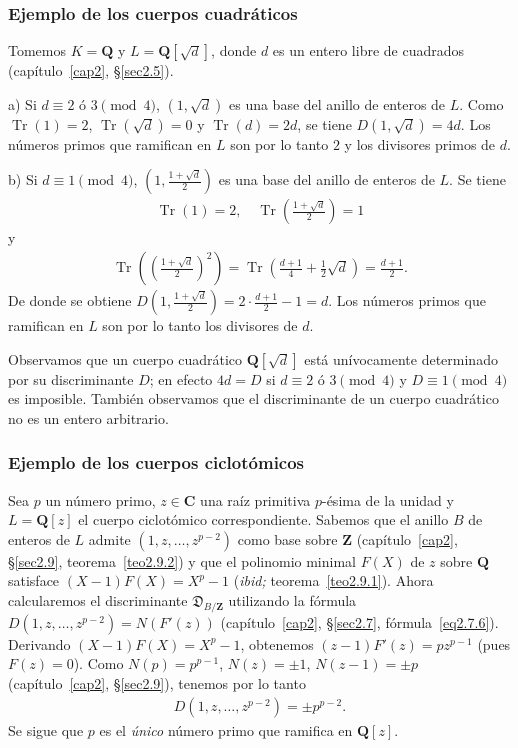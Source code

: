 \documentclass[oneside,bibtotoc,leqno,spanish]{amsbook}
\newcommand{\QQ}{\mathbf{Q}}
\newcommand{\ZZ}{\mathbf{Z}}
\newcommand{\CC}{\mathbf{C}}
\newcommand{\disc}{\mathfrak{D}}
\DeclareMathOperator{\Tr}{Tr}
\numberwithin{equation}{section}
\theoremstyle{defi}
\theoremstyle{note}
\theoremstyle{rem}
\numberwithin{theorem}{section}
\numberwithin{proposition}{section}
\numberwithin{definition}{section}
\numberwithin{lemma}{section}
\numberwithin{corollary}{section}
\numberwithin{example}{section}
\numberwithin{footnote}{section}%
\begin{document}
\subsubsection*{Ejemplo de los cuerpos cuadr\'aticos}

Tomemos $K = \QQ$ y $L = \QQ[\sqrt{d}]$, donde $d$ es un entero libre de cuadrados (cap\'itulo~\ref{cap2},
\S\ref{sec2.5}).

a) Si $d\equiv 2\text{ \'o }3\pmod 4$, $(1,\sqrt{d})$ es una base del anillo de enteros de $L$. Como
$\Tr(1) = 2$, $\Tr(\sqrt{d}) = 0$ y $\Tr(d) = 2d$, se tiene $D(1,\sqrt{d}) = 4d$. Los n\'umeros primos
que ramifican en $L$ son por lo tanto $2$ y los divisores primos de $d$.

b) Si $d\equiv 1\pmod 4$, $\left(1,\frac{1+\sqrt{d}}{2}\right)$ es una base del anillo de enteros de $L$.
Se tiene
\begin{gather*}
\Tr(1) = 2,\quad\Tr\left(\frac{1+\sqrt{d}}{2}\right) = 1
\end{gather*}
y
\begin{gather*}
\Tr\left(\left(\frac{1+\sqrt{d}}{2}\right)^{2}\right) = \Tr\left(\frac{d+1}{4}+\frac{1}{2}\sqrt{d}\right)=\frac{d+1}{2}.
\end{gather*}
De donde se obtiene $D\left(1,\frac{1+\sqrt{d}}{2}\right) = 2\cdot\frac{d+1}{2}-1 = d$. Los n\'umeros primos
que ramifican en $L$ son por lo tanto los divisores de $d$.

Observamos que un cuerpo cuadr\'atico $\QQ[\sqrt{d}]$ est\'a un\'ivocamente determinado por su discriminante
$D$; en efecto $4d = D$ si $d\equiv 2\text{ \'o }3\pmod 4$ y $D\equiv 1\pmod 4$ es imposible. Tambi\'en
observamos que el discriminante de un cuerpo cuadr\'atico no es un entero arbitrario.

\subsubsection*{Ejemplo de los cuerpos ciclot\'omicos}

Sea $p$ un n\'umero primo, $z\in\CC$ una ra\'iz primitiva $p$-\'esima de la unidad y $L = \QQ[z]$
el cuerpo ciclot\'omico correspondiente. Sabemos que el anillo $B$ de enteros de $L$ admite $(1,z,\dots,z^{p-2})$
como base sobre $\ZZ$ (cap\'itulo~\ref{cap2}, \S\ref{sec2.9}, teorema~\ref{teo2.9.2})
y que el polinomio minimal $F(X)$ de $z$ sobre $\QQ$
satisface $(X-1)F(X) = X^{p}-1$ ({\em ibid;} teorema~\ref{teo2.9.1}). Ahora calcularemos el discriminante $\disc_{B/\ZZ}$ utilizando
la f\'ormula $D(1,z,\dots,z^{p-2}) = N(F'(z))$ (cap\'itulo~\ref{cap2}, \S\ref{sec2.7}, f\'ormula~\eqref{eq2.7.6}).
Derivando $(X-1)F(X) = X^{p}-1$, obtenemos $(z-1)F'(z) = pz^{p-1}$ (pues $F(z) = 0$). Como
$N(p)=p^{p-1}$, $N(z) = \pm 1$, $N(z-1)=\pm p$ (cap\'itulo~\ref{cap2}, \S\ref{sec2.9}), tenemos por lo tanto
\begin{gather}
D(1,z,\dots,z^{p-2})=\pm p^{p-2}.
\end{gather}
Se sigue que $p$ es el {\em \'unico} n\'umero primo que ramifica en $\QQ[z]$.
\end{document}
